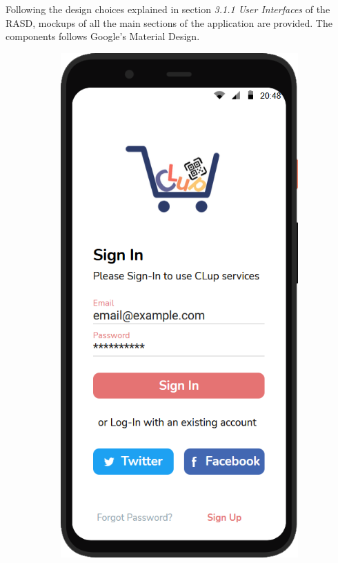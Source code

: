 Following the design choices explained in section \textit{3.1.1  User Interfaces} of the RASD, mockups of all the main sections of the application are provided. The components follows Google's Material Design.

\begin{figure}[H]
    \vspace{4cm}

    \begin{subfigure}{.33\textwidth}
        \centering
        \includegraphics[width=.95\linewidth]{Images/screen_01.png}

\end{subfigure}
\end{figure}
